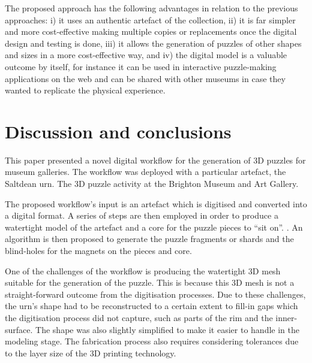 \documentclass[acmlarge,screen,dvipsnames]{acmart}
\begin{document}
The proposed approach has the following advantages in relation to the
previous approaches: i) it uses an authentic artefact of the
collection, ii) it is far simpler and more cost-effective making
multiple copies or replacements once the digital design and testing is
done, iii) it allows the generation of puzzles of other shapes and
sizes in a more cost-effective way, and iv) the digital model is a
valuable outcome by itself, for instance it can be used in interactive
puzzle-making applications on the web and can be shared with other
museums in case they wanted to replicate the physical experience.


\section{Discussion and conclusions}
\label{conclusions}

This paper presented a novel digital workflow for the generation of 3D
puzzles for museum galleries. The workflow was deployed with a
particular artefact, the Saltdean urn. The 3D puzzle activity  at the Brighton Museum and Art Gallery.

The proposed workflow's input is an artefact which is digitised and
converted into a digital format. A series of steps are then employed
in order to produce a watertight model of the artefact and a core for
the puzzle pieces to ``sit on''. . An algorithm is then proposed to
generate the puzzle fragments or shards and the  blind-holes for the
magnets on the pieces and core. 

One of the challenges of the workflow is producing the watertight 3D
mesh suitable for the generation of the puzzle. This is because this
3D mesh is not a straight-forward outcome from the digitisation
processes. Due to these challenges, the urn's shape had to be
reconstructed to a certain extent to fill-in gaps which the
digitisation process did not capture, such as parts of the rim and the
inner-surface. The shape was also slightly simplified to make it
easier to handle in the modeling stage. The fabrication process also
requires considering tolerances due to the layer size of the 3D
printing technology.
\end{document}
